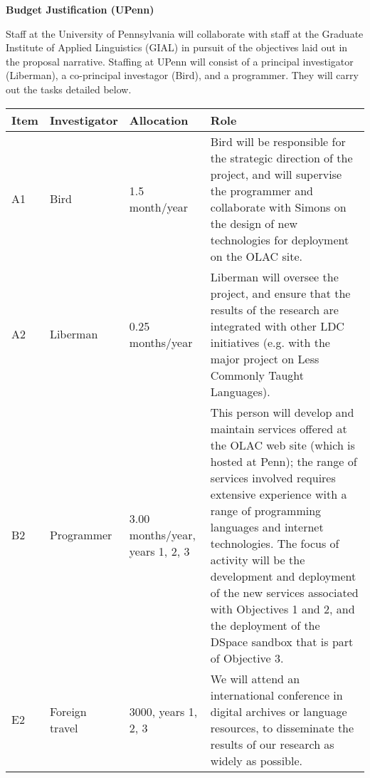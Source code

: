 \documentclass[11pt]{nsf}
\begin{document}
\begin{center}\textbf{\Large
Budget Justification (UPenn)
}\end{center}

Staff at the University of Pennsylvania will collaborate with staff at
the Graduate Institute of Applied Linguistics (GIAL) in pursuit of
the objectives laid out in the proposal narrative.
Staffing at UPenn will consist of a principal investigator (Liberman),
a co-principal investagor (Bird), and a programmer.  They will carry
out the tasks detailed below.

\vspace{1ex}

{\small\noindent
\begin{tabular}{lllp{3in}}
\textbf{Item} &
\textbf{Investigator} & \textbf{Allocation} & \textbf{Role} \\ \hline

A1 & Bird & 1.5 month/year &
Bird will be responsible for the strategic direction of the project,
and will supervise the programmer and collaborate with Simons on the
design of new technologies for deployment on the OLAC site.\\

A2 & Liberman & 0.25 months/year &
Liberman will oversee the project, and ensure that the results of the
research are integrated with other LDC initiatives (e.g. with the
major project on Less Commonly Taught Languages).\\

B2 & Programmer & 3.00 months/year, years 1, 2, 3 &
This person will develop and maintain services offered at the
OLAC web site (which is hosted at Penn); the range of services
involved requires extensive experience with
a range of programming languages and internet technologies.
The focus of activity will be the development and deployment
of the new services associated with Objectives 1 and 2, and
the deployment of the DSpace sandbox that is part of Objective 3.\\

E2 & Foreign travel & 3000, years 1, 2, 3 &
We will attend an international conference in digital archives or
language resources, to disseminate the results of our research as
widely as possible. \\

\end{tabular}}
\end{document}
